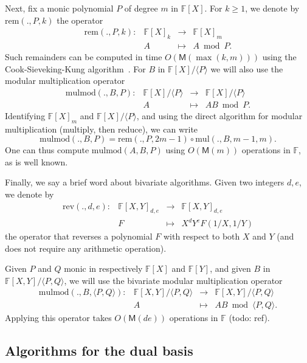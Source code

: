 \documentclass[12pt]{article}
\def\M {\ensuremath{\mathsf{M}}}
\def\F {\ensuremath{\mathbb{F}}}
\def\mul {\ensuremath{\mathrm{mul}}}
\def\rem {\ensuremath{\mathrm{rem}}}
\def\mulmod {\ensuremath{\mathrm{mulmod}}}
\def\rev {\ensuremath{\mathrm{rev}}}
\begin{document}
Next, fix a monic polynomial $P$ of degree $m$ in $\F[X]$. For $k \ge 1$, we denote by
$\rem(.,P,k)$ the operator
$$
\begin{array}{cccc}
\rem(.,P,k): &\F[X]_k& \to &\F[X]_{m}\\
& A & \mapsto & A \bmod P.
\end{array}$$ 
Such remainders can be computed in time $O(\M(\max(k,m)))$ using the
Cook-Sieveking-Kung algorithm~\cite[Chapter~9]{vzGG}. For $B$
in $\F[X]/\langle P \rangle$ we will also use the modular multiplication
operator
$$\begin{array}{cccc} \mulmod(.,B,P): & \F[X]/\langle P \rangle & \to
  & \F[X]/\langle P \rangle\\ & A & \mapsto & AB \bmod P.
\end{array}$$ 
Identifying $\F[X]_m$ and $\F[X]/\langle P \rangle$, and using the
direct algorithm for modular multiplication (multiply, then reduce),
we can write 
\begin{equation}
  \label{eq:mulmod}
  \mulmod(.,B,P) = \rem(.,P,2m-1) \circ \mul(.,B,m-1,m).
\end{equation}
One can thus compute $\mulmod(A,B,P)$ using $O(\M(m))$ operations in
$\F$, as is well known.

Finally, we say a brief word about bivariate algorithms.  Given two
integers $d,e$, we denote by
$$
\begin{array}{cccc}
\rev(.,d,e): &\F[X,Y]_{d,e} &\to& \F[X,Y]_{d,e}  \\
& F & \mapsto & X^d Y^e F(1/X,1/Y)
\end{array}$$
the operator that reverses a polynomial $F$ with respect to both $X$
and $Y$ (and does not require any arithmetic operation).

Given $P$ and $Q$ monic in respectively $\F[X]$ and $\F[Y]$, 
and given $B$ in $\F[X,Y]/\langle P,Q\rangle$, we will use the
bivariate modular multiplication operator
$$\begin{array}{cccc} \mulmod(.,B,\langle P,Q \rangle): & \F[X,Y]/\langle P,Q \rangle & \to
  & \F[X,Y]/\langle P,Q \rangle\\ & A & \mapsto & AB \bmod \langle P, Q \rangle.
\end{array}$$ 
Applying this operator takes $O(\M(de))$ operations in $\F$ (todo: ref).


\subsection{Algorithms for the dual basis}
\label{sec:algor-dual-basis}
\end{document}

